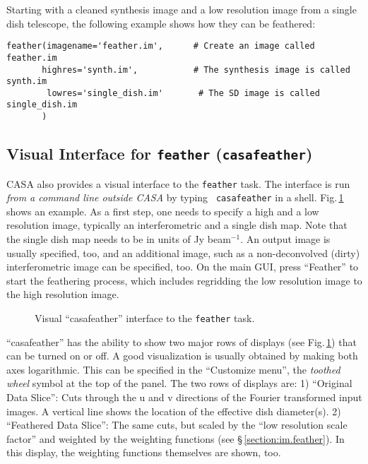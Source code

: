 Starting with a cleaned synthesis image and a low resolution image
from a single dish telescope, the following example shows how they
can be feathered:
\small
\begin{verbatim}
feather(imagename='feather.im',      # Create an image called feather.im
       highres='synth.im',           # The synthesis image is called synth.im
        lowres='single_dish.im'       # The SD image is called single_dish.im
       )
\end{verbatim}
\normalsize

\subsection{Visual Interface for {\tt feather} ({\tt casafeather})}
\label{section:im.casafeather}

CASA also provides a visual interface to the {\tt feather} task. The
interface is run {\it from a command line outside CASA} by typing {\tt
  casafeather} in a shell. Fig.\,\ref{fig:casafeather} shows an
example. As a first step, one needs to specify a high and a low
resolution image, typically an interferometric and a single dish
map. Note that the single dish map needs to be in units of Jy
beam$^{-1}$. An output image is usually specified, too, and an
additional image, such as a non-deconvolved (dirty) interferometric
image can be specified, too.  On the main GUI, press ``Feather'' to
start the feathering process, which includes regridding the low
resolution image to the high resolution image.

\begin{figure}[h!]
\begin{center}
\caption{\label{fig:casafeather} Visual ``casafeather'' interface
to the {\tt feather} task.} 
\hrulefill
\end{center}
\end{figure}

``casafeather'' has the ability to show two major rows of displays
(see Fig.\,\ref{fig:casafeather}) that can be turned on or off.  A
good visualization is usually obtained by making both axes
logarithmic. This can be specified in the ``Customize menu'', the {\it
  toothed wheel} symbol at the top of the panel. The two rows of
displays are: 1) ``Original Data Slice'': Cuts through the u and v
directions of the Fourier transformed input images. A vertical line
shows the location of the effective dish diameter(s).  2) ``Feathered
Data Slice'': The same cuts, but scaled by the ``low resolution scale
factor'' and weighted by the weighting functions (see
\S\,\ref{section:im.feather}). In this display, the weighting
functions themselves are shown, too.

